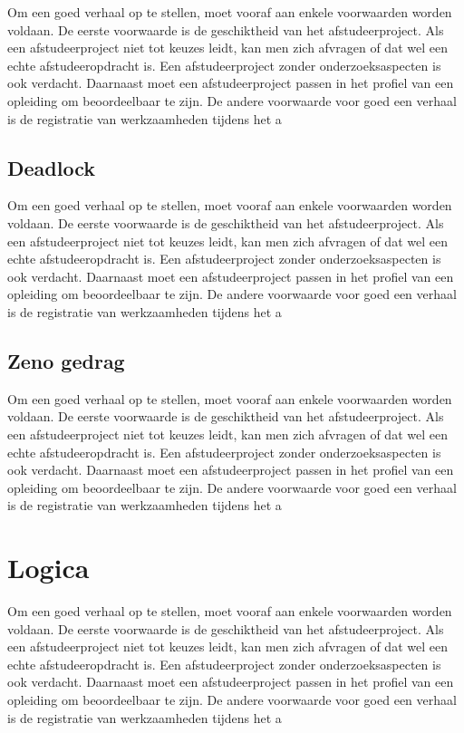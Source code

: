 Om een goed verhaal op te stellen, moet vooraf aan enkele voorwaarden
worden voldaan. De eerste voorwaarde is de geschiktheid van het
afstudeerproject. Als een afstudeerproject niet tot keuzes leidt, kan
men zich afvragen of dat wel een echte afstudeeropdracht is. Een
afstudeerproject zonder onderzoeksaspecten is ook verdacht. Daarnaast
moet een afstudeerproject passen in het profiel van een opleiding om
beoordeelbaar te zijn. De andere voorwaarde voor goed een verhaal is
de registratie van werkzaamheden tijdens het a
\subsection{Deadlock}

Om een goed verhaal op te stellen, moet vooraf aan enkele voorwaarden
worden voldaan. De eerste voorwaarde is de geschiktheid van het
afstudeerproject. Als een afstudeerproject niet tot keuzes leidt, kan
men zich afvragen of dat wel een echte afstudeeropdracht is. Een
afstudeerproject zonder onderzoeksaspecten is ook verdacht. Daarnaast
moet een afstudeerproject passen in het profiel van een opleiding om
beoordeelbaar te zijn. De andere voorwaarde voor goed een verhaal is
de registratie van werkzaamheden tijdens het a
\subsection{Zeno gedrag}

Om een goed verhaal op te stellen, moet vooraf aan enkele voorwaarden
worden voldaan. De eerste voorwaarde is de geschiktheid van het
afstudeerproject. Als een afstudeerproject niet tot keuzes leidt, kan
men zich afvragen of dat wel een echte afstudeeropdracht is. Een
afstudeerproject zonder onderzoeksaspecten is ook verdacht. Daarnaast
moet een afstudeerproject passen in het profiel van een opleiding om
beoordeelbaar te zijn. De andere voorwaarde voor goed een verhaal is
de registratie van werkzaamheden tijdens het a
\section{Logica}

Om een goed verhaal op te stellen, moet vooraf aan enkele voorwaarden
worden voldaan. De eerste voorwaarde is de geschiktheid van het
afstudeerproject. Als een afstudeerproject niet tot keuzes leidt, kan
men zich afvragen of dat wel een echte afstudeeropdracht is. Een
afstudeerproject zonder onderzoeksaspecten is ook verdacht. Daarnaast
moet een afstudeerproject passen in het profiel van een opleiding om
beoordeelbaar te zijn. De andere voorwaarde voor goed een verhaal is
de registratie van werkzaamheden tijdens het a




